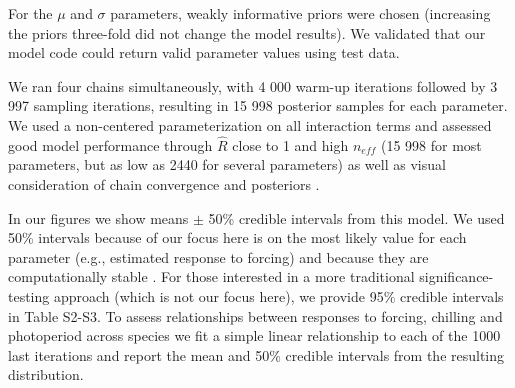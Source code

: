 \documentclass[11pt]{article}
\begin{document}
\noindent For the $\mu$ and $\sigma$ parameters, weakly informative priors were chosen (increasing the priors three-fold did not change the model results). We validated that our model code could return valid parameter values using test data. 

We ran four chains simultaneously, with 4 000 warm-up iterations followed by 3 997 sampling iterations, resulting in 15 998 posterior samples for each parameter. We used a non-centered parameterization on all interaction terms and assessed good model performance through $\hat{R}$ close to 1 and high $n_{eff}$ (15 998 for most parameters, but as low as 2440 for several parameters) as well as visual consideration of chain convergence and posteriors \citep{BDA}. 

In our figures we show means $\pm$ 50\% credible intervals from this model. We used 50\% intervals because of our focus here is on the most likely value for each parameter (e.g., estimated response to forcing) and because they are computationally stable \citep{BDA,Carpenter:2016aa}. For those interested in a more traditional significance-testing approach (which is not our focus here), we provide 95\% credible intervals in Table S2-S3. To assess relationships between responses to forcing, chilling and photoperiod across species we fit a simple linear relationship to each of the 1000 last iterations and report the mean and 50\% credible intervals from the resulting distribution.


\end{document}
